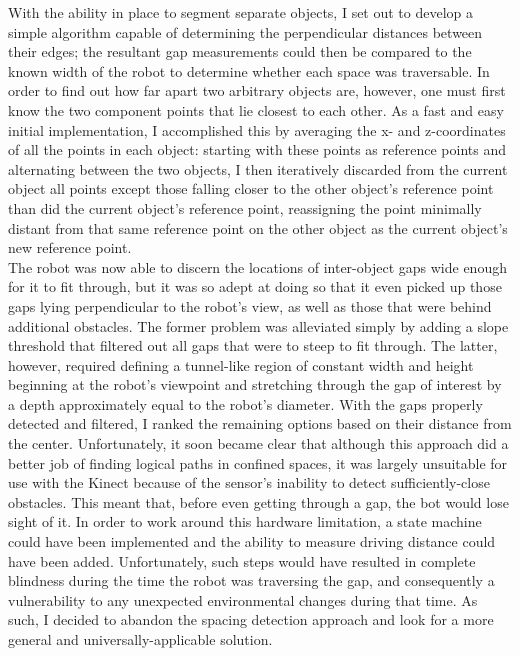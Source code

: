 \documentclass[12pt]{report}
\begin{document}
With the ability in place to segment separate objects, I set out to develop a simple algorithm capable of determining the perpendicular distances between their edges; the resultant gap measurements could then be compared to the known width of the robot to determine whether each space was traversable.  In order to find out how far apart two arbitrary objects are, however, one must first know the two component points that lie closest to each other.  As a fast and easy initial implementation, I accomplished this by averaging the x- and z-coordinates of all the points in each object: starting with these points as reference points and alternating between the two objects, I then iteratively discarded from the current object all points except those falling closer to the other object's reference point than did the current object's reference point, reassigning the point minimally distant from that same reference point on the other object as the current object's new reference point. \\
The robot was now able to discern the locations of inter-object gaps wide enough for it to fit through, but it was so adept at doing so that it even picked up those gaps lying perpendicular to the robot's view, as well as those that were behind additional obstacles.  The former problem was alleviated simply by adding a slope threshold that filtered out all gaps that were to steep to fit through.  The latter, however, required defining a tunnel-like region of constant width and height beginning at the robot's viewpoint and stretching through the gap of interest by a depth approximately equal to the robot's diameter.  With the gaps properly detected and filtered, I ranked the remaining options based on their distance from the center.  Unfortunately, it soon became clear that although this approach did a better job of finding logical paths in confined spaces, it was largely unsuitable for use with the Kinect because of the sensor's inability to detect sufficiently-close obstacles.  This meant that, before even getting through a gap, the bot would lose sight of it.  In order to work around this hardware limitation, a state machine could have been implemented and the ability to measure driving distance could have been added.  Unfortunately, such steps would have resulted in complete blindness during the time the robot was traversing the gap, and consequently a vulnerability to any unexpected environmental changes during that time.  As such, I decided to abandon the spacing detection approach and look for a more general and universally-applicable solution. \\
\end{document}
